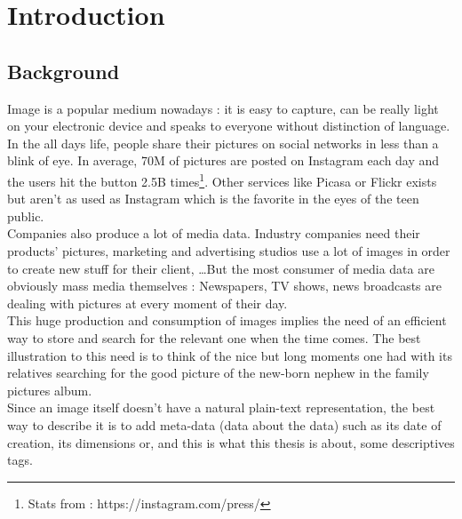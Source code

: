 
\chapter{Introduction} %

\label{Chapter1} %



\section{Background} %
\label{sec:background}

Image is a popular medium nowadays : it is easy to capture, can be really light on your electronic device and speaks to everyone without distinction of language.\\

In the all days life, people share their pictures on social networks in less than a blink of eye. In average, 70M of pictures are posted on Instagram each day and the users hit the  button 2.5B times\footnote{Stats from : https://instagram.com/press/}. Other services like Picasa or Flickr exists but aren't as used as Instagram which is the favorite in the eyes of the teen public.\\
Companies also produce a lot of media data. Industry companies need their products' pictures, marketing and advertising studios use a lot of images in order to create new stuff for their client, \dots But the most consumer of media data are obviously mass media themselves : Newspapers, TV shows, news broadcasts are dealing with pictures at every moment of their day.\\

This huge production and consumption of images implies the need of an efficient way to store and search for the relevant one when the time comes. The best illustration to this need is to think of the nice but long moments one had with its relatives searching for the good picture of the new-born nephew in the family pictures album.\\
Since an image itself doesn't have a natural plain-text representation, the best way to describe it is to add meta-data (data about the data) such as its date of creation, its dimensions or, and this is what this thesis is about, some descriptives tags.\\

